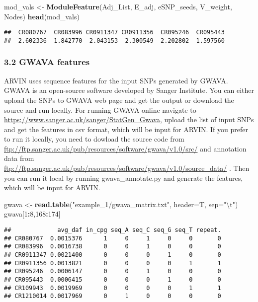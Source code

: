 \documentclass[]{article}
\newenvironment{Shaded}{\begin{snugshade}}{\end{snugshade}}
\newcommand{\KeywordTok}[1]{\textcolor[rgb]{0.13,0.29,0.53}{\textbf{#1}}}
\newcommand{\DataTypeTok}[1]{\textcolor[rgb]{0.13,0.29,0.53}{#1}}
\newcommand{\DecValTok}[1]{\textcolor[rgb]{0.00,0.00,0.81}{#1}}
\newcommand{\CharTok}[1]{\textcolor[rgb]{0.31,0.60,0.02}{#1}}
\newcommand{\StringTok}[1]{\textcolor[rgb]{0.31,0.60,0.02}{#1}}
\newcommand{\OperatorTok}[1]{\textcolor[rgb]{0.81,0.36,0.00}{\textbf{#1}}}
\newcommand{\NormalTok}[1]{#1}
\begin{document}
\begin{Shaded}
\begin{Highlighting}[]
\NormalTok{mod_vals <-}\StringTok{ }\KeywordTok{ModuleFeature}\NormalTok{(Adj_List, E_adj, eSNP_seeds, V_weight, Nodes)}
\KeywordTok{head}\NormalTok{(mod_vals)}
\end{Highlighting}
\end{Shaded}

\begin{verbatim}
##  CR080767  CR083996 CR0911347 CR0911356  CR095246  CR095443 
##  2.602336  1.842770  2.043153  2.300549  2.202802  1.597560
\end{verbatim}

\subsubsection{3.2 GWAVA features}\label{gwava-features}

ARVIN uses sequence features for the input SNPs generated by GWAVA.
GWAVA is an open-source software developed by Sanger Institute. You can
either upload the SNPs to GWAVA web page and get the output or download
the source and run locally. For running GWAVA online navigate to
\url{https://www.sanger.ac.uk/sanger/StatGen_Gwava}, upload the list of
input SNPs and get the features in csv format, which will be input for
ARVIN. If you prefer to run it locally, you need to dowload the source
code from
\url{ftp://ftp.sanger.ac.uk/pub/resources/software/gwava/v1.0/src/} and
annotation data from
\url{ftp://ftp.sanger.ac.uk/pub/resources/software/gwava/v1.0/source_data/}
. Then you can run it local by running gwava\_annotate.py and generate
the features, which will be input for ARVIN.

\begin{Shaded}
\begin{Highlighting}[]
\NormalTok{gwava <-}\StringTok{ }\KeywordTok{read.table}\NormalTok{(}\StringTok{"example_1/gwava_matrix.txt"}\NormalTok{, }\DataTypeTok{header=}\NormalTok{T, }\DataTypeTok{sep=}\StringTok{"}\CharTok{\textbackslash{}t}\StringTok{"}\NormalTok{)}
\NormalTok{gwava[}\DecValTok{1}\OperatorTok{:}\DecValTok{8}\NormalTok{,}\DecValTok{168}\OperatorTok{:}\DecValTok{174}\NormalTok{]}
\end{Highlighting}
\end{Shaded}

\begin{verbatim}
##             avg_daf in_cpg seq_A seq_C seq_G seq_T repeat.
## CR080767  0.0015376      1     0     1     0     0       0
## CR083996  0.0016738      0     0     1     0     0       0
## CR0911347 0.0021400      0     0     0     1     0       0
## CR0911356 0.0013821      0     0     0     0     1       1
## CR095246  0.0006147      0     0     1     0     0       0
## CR095443  0.0006415      0     0     0     1     0       0
## CR109943  0.0019969      0     0     0     0     1       1
## CR1210014 0.0017969      0     1     0     0     0       0
\end{verbatim}
\end{document}
